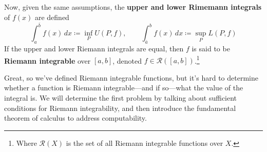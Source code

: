   \begin{definition}
    \label{def:riemann-integral}
    Now, given the same assumptions, the \textbf{upper and lower Rimemann integrals} of $f(x)$ are defined 
    \begin{equation}
      \int_a^{\bar{b}} f(x) \, dx \coloneqq \inf_P U(P, f), \qquad \int_{\bar{a}}^{b} f(x) \, dx \coloneqq \sup_P L(P, f)
    \end{equation}
    If the upper and lower Riemann integrals are equal, then $f$ is said to be \textbf{Riemann integrable} over $[a, b]$, denoted $f \in \mathcal{R}([a, b])$.\footnote{Where $\mathcal{R}(X)$ is the set of all Riemann integrable functions over $X$.}
  \end{definition} 

  Great, so we've defined Riemann integrable functions, but it's hard to determine whether a function is Riemann integrable---and if so---what the value of the integral is. We will determine the first problem by talking about sufficient conditions for Riemann integrability, and then introduce the fundamental theorem of calculus to address computability. 

